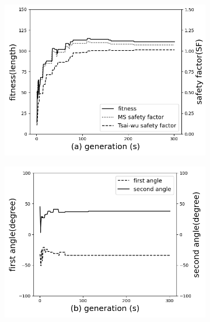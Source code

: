 \begin{figure}[!htb]
	\centering
		\begin{subfigure}[b]{0.8\linewidth}
			\includegraphics[width=\linewidth]{Figures/chapter4_second_two_distinct_angle_fitness_and_sr.png}
		\end{subfigure}

		\begin{subfigure}[b]{0.8\linewidth}
			\includegraphics[width=\linewidth]{Figures/chapter4_second_two_distinct_angle_angle_change.png}
		\end{subfigure}


\end{figure}
